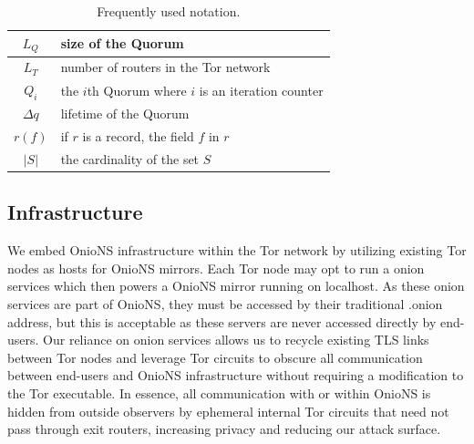 \documentclass[USenglish,oneside,twocolumn]{article}
\begin{document}
\begin{center}
	\vspace{0mm}
	\begin{table}[htp]
		\hspace{5 mm}
  		\begin{tabular}{ | c | l | }
			$ L_{Q} $ & size of the Quorum \\ \hline
			$ L_{T} $ & number of routers in the Tor network \\ \hline
			$ Q_{i} $ & the $ i $th Quorum where $ i $ is an iteration counter \\ \hline
			$ \Delta q $ & lifetime of the Quorum \\ \hline
			$ r(f) $ & if $ r $ is a record, the field $ f $ in $ r $ \\ \hline
			$ \left\vert{S}\right\vert $ & the cardinality of the set $ S $ \\
		\end{tabular}
		\caption{Frequently used notation.}
	\end{table}
	\vspace{-12mm}
\end{center}


\subsection{Infrastructure}

We embed OnioNS infrastructure within the Tor network by utilizing existing Tor nodes as hosts for OnioNS mirrors. Each Tor node may opt to run a onion services which then powers a OnioNS mirror running on localhost. As these onion services are part of OnioNS, they must be accessed by their traditional .onion address, but this is acceptable as these servers are never accessed directly by end-users. Our reliance on onion services allows us to recycle existing TLS links between Tor nodes and leverage Tor circuits to obscure all communication between end-users and OnioNS infrastructure without requiring a modification to the Tor executable. In essence, all communication with or within OnioNS is hidden from outside observers by ephemeral internal Tor circuits that need not pass through exit routers, increasing privacy and reducing our attack surface.
\end{document}
